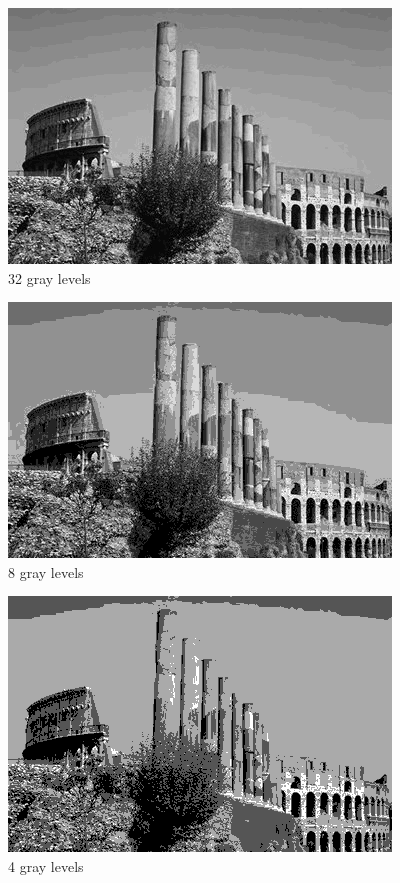 \documentclass{article}
\begin{document}
\begin{figure}[H]
\centering
\includegraphics[width=288pt]{../result/quantize-32.png}
\caption{32 gray levels}
\label{quan32}
\end{figure}

\begin{figure}[H]
\centering
\includegraphics[width=288pt]{../result/quantize-8.png}
\caption{8 gray levels}
\label{quan8}
\end{figure}

\begin{figure}[H]
\centering
\includegraphics[width=288pt]{../result/quantize-4.png}
\caption{4 gray levels}
\label{quan4}
\end{figure}
\end{document}
